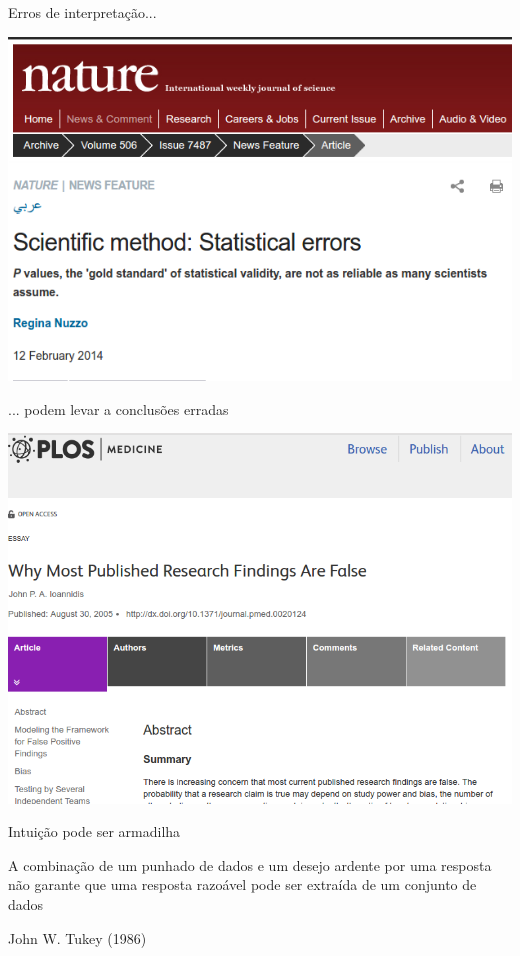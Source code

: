 \documentclass{beamer}
\begin{document}
\begin{frame}{Erros de interpretação...}
  \begin{center}
    \includegraphics[width=.95\textwidth]{Imagens/Nature-pvalor}
  \end{center}
\end{frame}

\begin{frame}{... podem levar a conclusões erradas}
  \begin{center}
    \includegraphics[width=.95\textwidth]{Imagens/Ioannidis}
  \end{center}
\end{frame}

\begin{frame}{Intuição pode ser armadilha}
  \begin{block}{}
    A combinação de um punhado de dados e um desejo ardente por uma resposta não garante que uma resposta razoável pode ser extraída de um conjunto de dados
  \end{block}
\hfill John W. Tukey (1986)
\end{frame}
\end{document}
